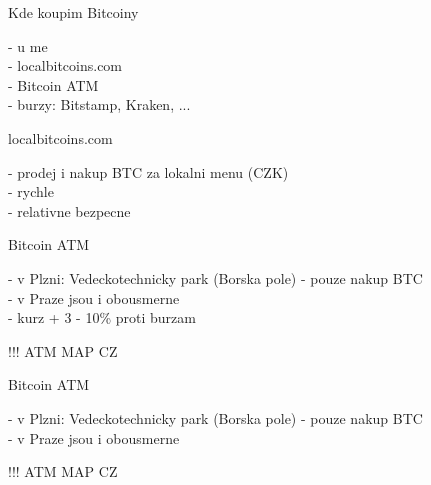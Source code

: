 \documentclass{beamer}
\begin{document}
\begin{frame}

    {\LARGE Kde koupim Bitcoiny}\\

    \vspace{5mm}

    - u me\\
    - localbitcoins.com\\
    - Bitcoin ATM\\
    - burzy: Bitstamp, Kraken, ...\\

\end{frame}

\begin{frame}

    {\LARGE localbitcoins.com}\\

    \vspace{5mm}

    - prodej i nakup BTC za lokalni menu (CZK)\\
    - rychle\\
    - relativne bezpecne\\

\end{frame}

\begin{frame}

    {\LARGE Bitcoin ATM}\\

    \vspace{5mm}

    - v Plzni: Vedeckotechnicky park (Borska pole) - pouze nakup BTC\\
    - v Praze jsou i obousmerne\\
    - kurz + 3 - 10\% proti burzam\\

    \vspace{5mm}

    !!! ATM MAP CZ %

\end{frame}

\begin{frame}

    {\LARGE Bitcoin ATM}\\

    \vspace{5mm}

    - v Plzni: Vedeckotechnicky park (Borska pole) - pouze nakup BTC\\
    - v Praze jsou i obousmerne\\

    \vspace{5mm}

    !!! ATM MAP CZ %

\end{frame}
\end{document}

